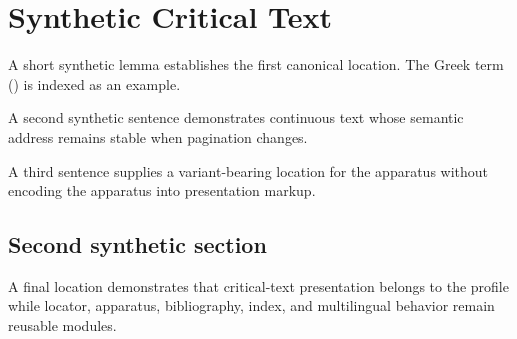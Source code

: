 \chapter{Synthetic Critical Text}
A short synthetic lemma establishes the first canonical location. The Greek term  () is indexed as an example.

A second synthetic sentence demonstrates continuous text whose semantic address remains stable when pagination changes.\autocite{syntheticcritical2027}

A third sentence supplies a variant-bearing location for the apparatus without encoding the apparatus into presentation markup.

\section{Second synthetic section}
A final location demonstrates that critical-text presentation belongs to the profile while locator, apparatus, bibliography, index, and multilingual behavior remain reusable modules.
